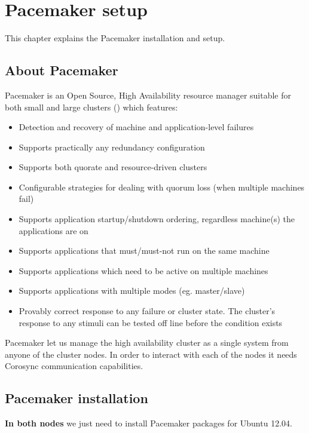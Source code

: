 
\chapter {Pacemaker setup}
\label{chap:pacemaker-setup}

This chapter explains the Pacemaker installation and setup.

\section {\label{sec:about-pacemaker}About Pacemaker}

Pacemaker is an Open Source, High Availability resource manager suitable for both small and large clusters (\cite{PacemakerWebpage}) which features:
\begin{itemize}
  \item Detection and recovery of machine and application-level failures
  \item Supports practically any redundancy configuration
  \item Supports both quorate and resource-driven clusters
  \item Configurable strategies for dealing with quorum loss (when multiple machines fail)
  \item Supports application startup/shutdown ordering, regardless machine(s) the applications are on
  \item Supports applications that must/must-not run on the same machine
  \item Supports applications which need to be active on multiple machines
  \item Supports applications with multiple modes (eg. master/slave)
  \item Provably correct response to any failure or cluster state. The cluster's response to any stimuli can be tested off line before the condition exists
\end{itemize}

Pacemaker let us manage the high availability cluster as a single system from anyone of the cluster nodes. In order to interact with each of the nodes it needs Corosync communication capabilities.


\section {Pacemaker installation}
\textbf{In both nodes} we just need to install Pacemaker packages for Ubuntu 12.04.

